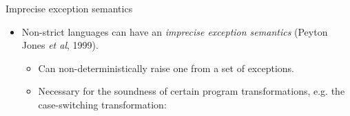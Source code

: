 \documentclass[serif,professionalfont]{beamer}
\theoremstyle{plain}
\theoremstyle{definition}
\begin{document}
\begin{frame}{Imprecise exception semantics}

    \begin{itemize}
    
        \item Non-strict languages can have an \emph{imprecise exception semantics} (Peyton Jones \emph{et al}, 1999).
        
            \begin{itemize}
            
                \item Can non-deterministically raise one from a set of exceptions.
                
                \item Necessary for the soundness of certain program transformations, e.g. the case-switching transformation:
            
            \end{itemize}
   
    \end{itemize}


\end{frame}
\end{document}
